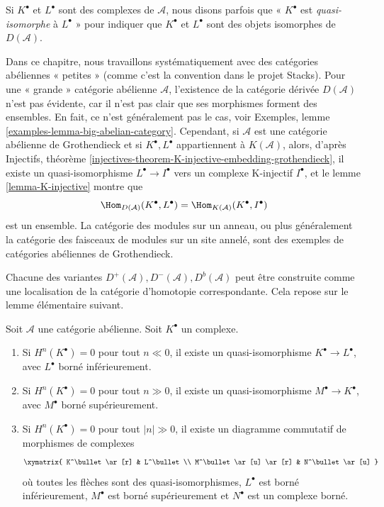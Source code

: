 \noindent
Si $K^\bullet$ et $L^\bullet$ sont des complexes de $\mathcal{A}$, nous disons
parfois que « $K^\bullet$ est {\it quasi-isomorphe} à $L^\bullet$ » pour
indiquer que $K^\bullet$ et $L^\bullet$ sont des objets isomorphes de
$D(\mathcal{A})$.

\begin{remark}
\label{remark-existence-derived}
Dans ce chapitre, nous travaillons systématiquement avec des catégories
abéliennes « petites » (comme c'est la convention dans le projet Stacks). Pour
une « grande » catégorie abélienne $\mathcal{A}$, l'existence de la catégorie
dérivée $D(\mathcal{A})$ n'est pas évidente, car il n'est pas clair que ses
morphismes forment des ensembles. En fait, ce n'est généralement pas le cas,
voir Exemples, lemme \ref{examples-lemma-big-abelian-category}. Cependant, si
$\mathcal{A}$ est une catégorie abélienne de Grothendieck et si
$K^\bullet, L^\bullet$ appartiennent à $K(\mathcal{A})$, alors, d'après
Injectifs, théorème
\ref{injectives-theorem-K-injective-embedding-grothendieck}, il existe un
quasi-isomorphisme $L^\bullet \to I^\bullet$ vers un complexe K-injectif
$I^\bullet$, et le lemme \ref{lemma-K-injective} montre que
$$
\Hom_{D(\mathcal{A})}(K^\bullet, L^\bullet) =
\Hom_{K(\mathcal{A})}(K^\bullet, I^\bullet)
$$
est un ensemble. La catégorie des modules sur un anneau, ou plus généralement
la catégorie des faisceaux de modules sur un site annelé, sont des exemples de
catégories abéliennes de Grothendieck.
\end{remark}

\noindent
Chacune des variantes
$D^{+}(\mathcal{A}), D^{-}(\mathcal{A}), D^b(\mathcal{A})$ peut être construite
comme une localisation de la catégorie d'homotopie correspondante. Cela repose
sur le lemme élémentaire suivant.

\begin{lemma}
\label{lemma-complex-cohomology-bounded}
Soit $\mathcal{A}$ une catégorie abélienne. Soit $K^\bullet$ un complexe.
\begin{enumerate}
\item Si $H^n(K^\bullet) = 0$ pour tout $n \ll 0$, il existe un
quasi-isomorphisme $K^\bullet \to L^\bullet$, avec $L^\bullet$ borné
inférieurement.
\item Si $H^n(K^\bullet) = 0$ pour tout $n \gg 0$, il existe un
quasi-isomorphisme $M^\bullet \to K^\bullet$, avec $M^\bullet$ borné
supérieurement.
\item Si $H^n(K^\bullet) = 0$ pour tout $|n| \gg 0$, il existe un diagramme
commutatif de morphismes de complexes
$$
\xymatrix{
K^\bullet \ar[r] & L^\bullet \\
M^\bullet \ar[u] \ar[r] & N^\bullet \ar[u]
}
$$
où toutes les flèches sont des quasi-isomorphismes, $L^\bullet$ est borné
inférieurement, $M^\bullet$ est borné supérieurement et $N^\bullet$ est un
complexe borné.
\end{enumerate}
\end{lemma}

